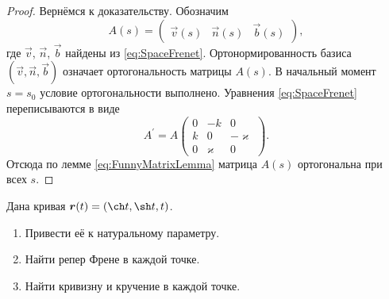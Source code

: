 \begin{proof}
	Вернёмся к доказательству. Обозначим
	\[
		A(s) = \begin{pmatrix}
			\vec{v}(s) & \vec{n}(s) & \vec{b}(s)
		\end{pmatrix},
	\]
	где $\vec{v}$, $\vec{n}$, $\vec{b}$ найдены из \eqref{eq:SpaceFrenet}. Ортонормированность базиса $(\vec{v}, \vec{n}, \vec{b})$ означает ортогональность матрицы $A(s)$. В начальный момент $s = s_0$ условие ортогональности выполнено. Уравнения \eqref{eq:SpaceFrenet} переписываются в виде
	\[
		A^\prime = A
		\begin{pmatrix}
			0 & -k & 0\\
			k & 0 & -\varkappa\\
			0 & \varkappa & 0
		\end{pmatrix}.
	\]
	Отсюда по лемме \eqref{eq:FunnyMatrixLemma} матрица $A(s)$ ортогональна при всех $s$.
\end{proof}


\begin{problem}
	Дана кривая $\vec{r}(t) = (\ch t, \sh t, t)$.
	\begin{enumerate}[nolistsep, label=(\arabic*)]
		\item Привести её к натуральному параметру.
		\item Найти репер Френе в каждой точке.
		\item Найти кривизну и кручение в каждой точке.
	\end{enumerate}
\end{problem}

